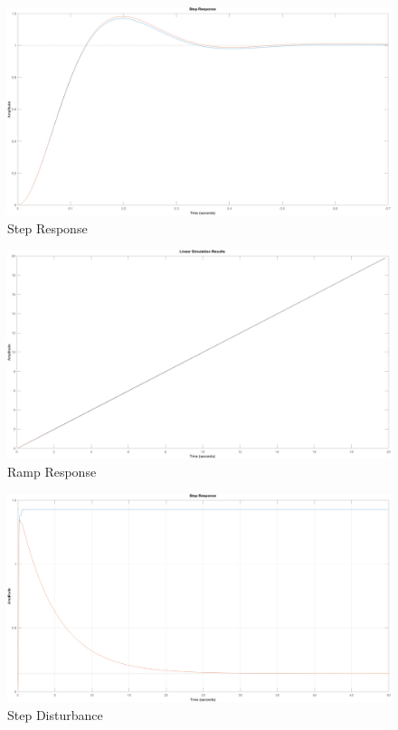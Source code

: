 \documentclass[12pt]{article}
\begin{document}
\begin{figure}[h]
    \centering
    \includegraphics[width=\textwidth]{step_response}
    \caption{\label{fig:step}Step Response}
\end{figure}

\begin{figure}[h]
    \centering
    \includegraphics[width=\textwidth]{ramp_response}
    \caption{\label{fig:ramp}Ramp Response}
\end{figure}

\begin{figure}[h]
    \centering
    \includegraphics[width=\textwidth]{dist_response}
    \caption{\label{fig:dist}Step Disturbance}
\end{figure}
\end{document}
